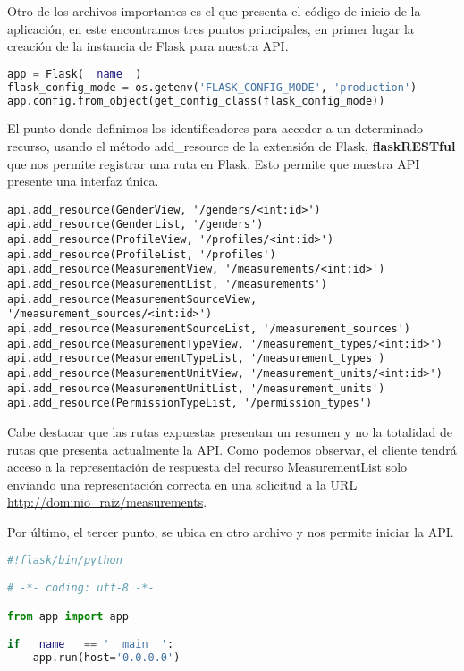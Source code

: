 Otro de los archivos importantes es el que presenta el código de inicio de la aplicación, en este encontramos tres puntos principales, en primer lugar la creación de la instancia de Flask para nuestra API.

\begin{lstlisting}[language=Python]
app = Flask(__name__)
flask_config_mode = os.getenv('FLASK_CONFIG_MODE', 'production')
app.config.from_object(get_config_class(flask_config_mode))
\end{lstlisting}

El punto donde definimos los identificadores para acceder a un determinado recurso, usando el método add\_resource de la extensión de Flask, \textbf{flaskRESTful} que nos permite registrar una ruta en Flask. Esto permite que nuestra API presente una interfaz única.

\begin{lstlisting}
api.add_resource(GenderView, '/genders/<int:id>')
api.add_resource(GenderList, '/genders')
api.add_resource(ProfileView, '/profiles/<int:id>')
api.add_resource(ProfileList, '/profiles')
api.add_resource(MeasurementView, '/measurements/<int:id>')
api.add_resource(MeasurementList, '/measurements')
api.add_resource(MeasurementSourceView, '/measurement_sources/<int:id>')
api.add_resource(MeasurementSourceList, '/measurement_sources')
api.add_resource(MeasurementTypeView, '/measurement_types/<int:id>')
api.add_resource(MeasurementTypeList, '/measurement_types')
api.add_resource(MeasurementUnitView, '/measurement_units/<int:id>')
api.add_resource(MeasurementUnitList, '/measurement_units')
api.add_resource(PermissionTypeList, '/permission_types')
\end{lstlisting}

\begin{sloppypar}
Cabe destacar que las rutas expuestas presentan un resumen y no la totalidad de rutas que presenta actualmente la API.
Como podemos observar, el cliente tendrá acceso a la representación de respuesta del recurso MeasurementList solo enviando una representación correcta en una solicitud a la URL \url{http://dominio_raiz/measurements}.
\end{sloppypar}

Por último, el tercer punto, se ubica en otro archivo y nos permite iniciar la API.

\begin{lstlisting}[language=Python]
#!flask/bin/python

# -*- coding: utf-8 -*-

from app import app

if __name__ == '__main__':
    app.run(host='0.0.0.0')
\end{lstlisting}

